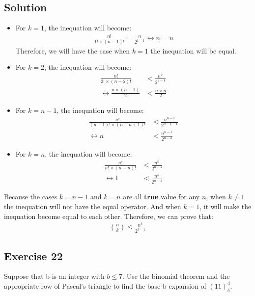 \documentclass{article}
\theoremstyle{mytheoremstyle}
\theoremstyle{mytheoremstyle}
\theoremstyle{myproblemstyle}
\begin{document}
    \subsection*{Solution}
    \begin{itemize}
        \item For \(k = 1\), the inequation will become:
        \begin{align*}
            \frac{n!}{1! \times (n - 1)!} = \frac{n}{2^{1 - 1}} \leftrightarrow n = n
        \end{align*}
        Therefore, we will have the case when \(k = 1\) the inequation will be equal.
        \item For \(k = 2\), the inequation will become:
        \begin{align*}
            \frac{n!}{2! \times (n - 2)!} &< \frac{n^2}{2^{2 - 1}}\\
            \leftrightarrow \frac{n \times (n - 1)}{2} &< \frac{n \times n}{2}
        \end{align*}
        \item For \(k = n - 1\), the inequation will become:
        \begin{align*}
            \frac{n!}{(n - 1)! \times (n - n + 1)!} &< \frac{n^{n - 1}}{2^{n - 1 - 1}}\\
            \leftrightarrow n &< \frac{n^{n - 1}}{2^{n - 2}}
        \end{align*}
        \item For \(k = n\), the inequation will become:
        \begin{align*}
            \frac{n!}{n! \times (n - n) !} &< \frac{n^n}{2^{n - 1}}\\ 
            \leftrightarrow 1 &< \frac{n^n}{2^{n - 1}}
        \end{align*}
    \end{itemize}
    Because the cases \(k = n - 1\) and \(k = n\) are all \textbf{true} value for any \(n\), when \(k \neq 1\) the inequation
    will not have the equal operator. And when \(k = 1\), it will make the inequation become equal to each other. Therefore, we can prove that:
    \begin{align*}
        \binom{n}{k} \leq \frac{n^k}{2^{k - 1}}
    \end{align*}
    \subsection*{Exercise 22}
    Suppose that b is an integer with \(b \leq 7\). Use the binomial theorem and the appropriate row of Pascal’s triangle
    to find the base-b expansion of \((11)^4_b\).
\end{document}
